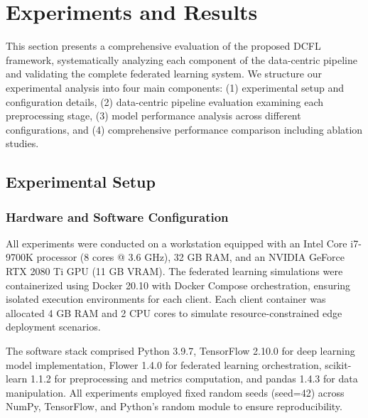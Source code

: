 \documentclass[12pt]{article}
\begin{document}





\section{Experiments and Results}
\label{sec:results}

This section presents a comprehensive evaluation of the proposed DCFL framework, systematically analyzing each component of the data-centric pipeline and validating the complete federated learning system. We structure our experimental analysis into four main components: (1) experimental setup and configuration details, (2) data-centric pipeline evaluation examining each preprocessing stage, (3) model performance analysis across different configurations, and (4) comprehensive performance comparison including ablation studies.

\subsection{Experimental Setup}

\subsubsection{Hardware and Software Configuration}

All experiments were conducted on a workstation equipped with an Intel Core i7-9700K processor (8 cores @ 3.6 GHz), 32 GB RAM, and an NVIDIA GeForce RTX 2080 Ti GPU (11 GB VRAM). The federated learning simulations were containerized using Docker 20.10 with Docker Compose orchestration, ensuring isolated execution environments for each client. Each client container was allocated 4 GB RAM and 2 CPU cores to simulate resource-constrained edge deployment scenarios.

The software stack comprised Python 3.9.7, TensorFlow 2.10.0 for deep learning model implementation, Flower 1.4.0 for federated learning orchestration, scikit-learn 1.1.2 for preprocessing and metrics computation, and pandas 1.4.3 for data manipulation. All experiments employed fixed random seeds (seed=42) across NumPy, TensorFlow, and Python's random module to ensure reproducibility.
\end{document}
